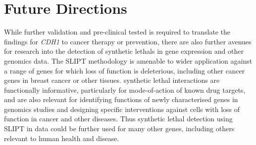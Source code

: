 \iffalse
\section{Evaluating the Synthetic Lethality Prediction Tool}
\label{chapt6:slipt}


\subsection{Strength of the Synthetic Lethality Prediction Tool}
\label{chapt6:slipt_strengths}

\subsection{Limitations of the Synthetic Lethality Prediction Tool}
\label{chapt6:slipt_limitations}

\subsection{Comparisons to Alternative Methods}
\label{chapt6:slipt_compare}

\subsubsection{Combined with Experimental Screening}
\label{chapt6:slipt_compare_experimental}

\subsubsection{Differences to Computational Methods}
\label{chapt6:slipt_compare_computational}
\fi

\section{Future Directions}
\label{chapt6:future}

While further validation and pre-clinical tested is required to translate the findings for \textit{CDH1} to cancer therapy or prevention, there are also further avenues for research into the detection of \glspl{synthetic lethal} in \gls{gene expression} and other \glspl{genomic} data. The \gls{SLIPT} methodology is amenable to wider application against a range of genes for which loss of function is deleterious, including other cancer genes in breast cancer or other tissues. \Gls{synthetic lethal} interactions are functionally informative, particularly for mode-of-action of known drug targets, and are also relevant for identifying functions of newly characterised genes in \glspl{genomic} studies and designing specific interventions against cells with loss of function in cancer and other diseases. Thus \gls{synthetic lethal} detection using \gls{SLIPT} in  data could be further used for many other genes, including others relevant to human health and disease.


